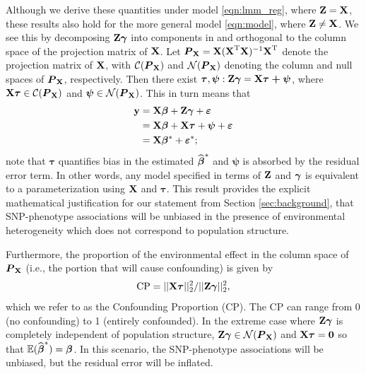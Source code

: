 Although we derive these quantities under model \eqref{eqn:lmm_reg}, where $\textbf{Z} = \textbf{X}$, these results also hold for the more general model \eqref{eqn:model}, where $\textbf{Z} \ne \textbf{X}$. We see this by decomposing $\textbf{Z} \boldsymbol{\gamma}$ into components in and orthogonal to the column space of the projection matrix of $\textbf{X}$.  Let $\boldsymbol{P}_{\textbf{X}} = \textbf{X} (\textbf{X}^{\text{T}} \textbf{X})^{-1} \textbf{X}^{\text{T}}$ denote the projection matrix of $\textbf{X}$, with $\mathcal{C}(\boldsymbol{P}_{\textbf{X}})$ and $\mathcal{N}(\boldsymbol{P}_{\textbf{X}})$ denoting the column and null spaces of $\boldsymbol{P}_{\textbf{X}}$, respectively. Then there exist $\boldsymbol{\tau}, \boldsymbol{\psi}: \textbf{Z} \boldsymbol{\gamma} = \textbf{X} \boldsymbol{\tau + \psi}$, where $\textbf{X} \boldsymbol{\tau} \in \mathcal{C}(\boldsymbol{P}_{\textbf{X}})$ and $\boldsymbol{\psi} \in \mathcal{N}(\boldsymbol{P}_{\textbf{X}})$.  This in turn means that
\begin{align}
    \label{eqn:partition_e}    \textbf{y} &= \textbf{X}\boldsymbol{\beta}{} + \textbf{Z}\boldsymbol{\gamma} + \boldsymbol{\varepsilon}{} \notag \\
    &= \textbf{X}\boldsymbol{\beta}{} + \textbf{X} \boldsymbol{\tau} + \boldsymbol{\psi} + \boldsymbol{\varepsilon}{} \notag\\
    &=  \textbf{X} \boldsymbol{\beta}{}{^*} + \boldsymbol{\varepsilon}{}{^*};
\end{align}
note that $\boldsymbol{\tau}$ quantifies bias in the estimated $\widehat{\boldsymbol{\beta}{}}^*$ and $\boldsymbol{\psi}$ is absorbed by the residual error term. In other words, any model specified in terms of $\textbf{Z}$ and $\boldsymbol{\gamma}$ is equivalent to a parameterization using $\textbf{X}$ and $\boldsymbol{\tau}$.  This result provides the explicit mathematical justification for our statement from Section \ref{sec:background}, that SNP-phenotype associations will be unbiased in the presence of environmental heterogeneity which does not correspond to population structure.

Furthermore, the proportion of the environmental effect in the column space of $\boldsymbol{P}_{\textbf{X}}$ (i.e., the portion that will cause confounding) is given by
\begin{equation}
    \label{eqn:ratio}
    \text{CP} = ||\textbf{X} \boldsymbol{\tau}||_2^2 / ||\textbf{Z} \boldsymbol{\gamma}||_2^2,
\end{equation}
which we refer to as the Confounding Proportion (CP). The CP can range from 0 (no confounding) to 1 (entirely confounded). In the extreme case where $\textbf{Z} \boldsymbol{\gamma}$ is completely independent of population structure, $\textbf{Z} \boldsymbol{\gamma} \in \mathcal{N}(\boldsymbol{P}_{\textbf{X}})$ and $\textbf{X} \boldsymbol{\tau} = \boldsymbol{0}$ so that $\mathbb{E}(\widehat{\boldsymbol{\beta}{}}^*) = \boldsymbol{\beta}{}$. In this scenario, the SNP-phenotype associations will be unbiased, but the residual error will be inflated. 

